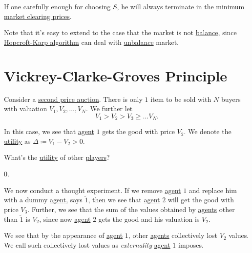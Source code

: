 If one carefully enough for choosing \(S\), he will always terminate in the minimum \hyperref[note:market-clearing-prices]{market clearing prices}.

\begin{note}
	Note that it's easy to extend to the case that the market is not \hyperref[def:balance]{balance}, since
	\hyperref[algo:Hopcroft-Karp-algorithm]{Hopcroft-Karp algorithm} can deal with \hyperref[def:balance]{unbalance} market.
\end{note}

\section{Vickrey-Clarke-Groves Principle}
Consider a \hyperref[eg:second-price-auction]{second price auction}. There is only \(1\) item to be sold with \(N\) buyers with valuation
\(V_{1}, V_{2}, \ldots , V_{N}\). We further let
\[
	V_{1}>V_{2}>V_{3}\geq \ldots V_{N}.
\]

In this case, we see that \hyperref[def:player]{agent} \(1\) gets the good with price \(V_{2}\). We denote the \hyperref[def:reward]{utility}
as \(\Delta\coloneqq V_{1}-V_{2}>0\).

\begin{problem}
What's the \hyperref[def:reward]{utility} of other \hyperref[def:player]{players}?
\end{problem}
\begin{answer}
	\(0\).
\end{answer}

We now conduct a thought experiment. If we remove \hyperref[def:player]{agent} \(1\) and replace him with a dummy \hyperref[def:player]{agent},
says \(\tilde{1}\), then we see that \hyperref[def:player]{agent} \(2\) will get the good with price \(V_{3}\). Further, we see that the sum of
the values obtained by \hyperref[def:player]{agents} other than \(\tilde{1}\) is \(V_{2}\), since now \hyperref[def:player]{agent} \(2\) gets
the good and his valuation is \(V_{2}\).

We see that by the appearance of \hyperref[def:player]{agent} \(1\), other \hyperref[def:player]{agents} collectively lost \(V_{2}\) values.
We call such collectively lost values as \emph{externality} \hyperref[def:player]{agent} \(1\) imposes.

